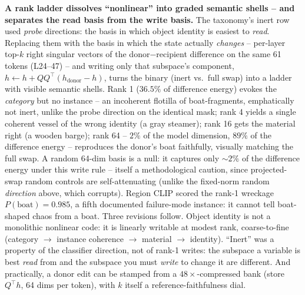 \documentclass[10pt,twocolumn,letterpaper]{article}
\begin{document}
\textbf{A rank ladder dissolves ``nonlinear'' into graded semantic
shells -- and separates the read basis from the write basis.} The
taxonomy's inert row used \emph{probe} directions: the basis in which
object identity is easiest to \emph{read}. Replacing them with the
basis in which the state actually \emph{changes} -- per-layer top-$k$
right singular vectors of the donor$-$recipient difference on the same
61 tokens (L24--47) -- and writing only that subspace's component,
$h \leftarrow h + QQ^{\top}(h_{\text{donor}} - h)$, turns the binary
(inert vs.\ full swap) into a ladder with visible semantic shells.
Rank 1 ($36.5\%$ of difference energy) evokes the \emph{category} but
no instance -- an incoherent flotilla of boat-fragments, emphatically
not inert, unlike the probe direction on the identical mask; rank 4
yields a single coherent vessel of the wrong identity (a gray
steamer); rank 16 gets the material right (a wooden barge); rank 64 --
$2\%$ of the model dimension, $89\%$ of the difference energy --
reproduces the donor's boat faithfully, visually matching the full
swap. A random 64-dim basis is a null: it captures only ${\sim}2\%$ of
the difference energy under this write rule -- itself a methodological
caution, since projected-swap random controls are self-attenuating
(unlike the fixed-norm random \emph{direction} above, which corrupts).
Region CLIP scored the rank-1 wreckage $P(\text{boat}){=}0.985$, a
fifth documented failure-mode instance: it cannot tell boat-shaped
chaos from a boat. Three revisions follow. Object identity is not a
monolithic nonlinear code: it is linearly writable at modest rank,
coarse-to-fine (category $\to$ instance coherence $\to$ material $\to$
identity). ``Inert'' was a property of the classifier direction, not
of rank-1 writes: the subspace a variable is best \emph{read} from and
the subspace you must \emph{write} to change it are different. And
practically, a donor edit can be stamped from a $48\times$-compressed
bank (store $Q^{\top}h$, 64 dims per token), with $k$ itself a
reference-faithfulness dial.
\end{document}

